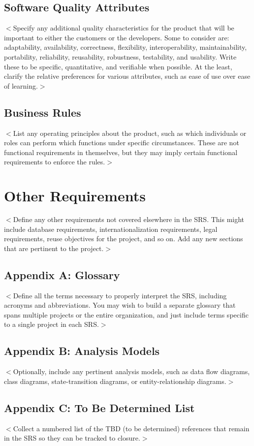 \documentclass{scrreprt}
\begin{document}
\section{Software Quality Attributes}
$<$Specify any additional quality characteristics for the product that will be 
important to either the customers or the developers. Some to consider are: 
adaptability, availability, correctness, flexibility, interoperability, 
maintainability, portability, reliability, reusability, robustness, testability, 
and usability. Write these to be specific, quantitative, and verifiable when 
possible. At the least, clarify the relative preferences for various attributes, 
such as ease of use over ease of learning.$>$

\section{Business Rules}
$<$List any operating principles about the product, such as which individuals or 
roles can perform which functions under specific circumstances. These are not 
functional requirements in themselves, but they may imply certain functional 
requirements to enforce the rules.$>$


\chapter{Other Requirements}
$<$Define any other requirements not covered elsewhere in the SRS. This might 
include database requirements, internationalization requirements, legal 
requirements, reuse objectives for the project, and so on. Add any new sections 
that are pertinent to the project.$>$

\section{Appendix A: Glossary}
$<$Define all the terms necessary to properly interpret the SRS, including 
acronyms and abbreviations. You may wish to build a separate glossary that spans 
multiple projects or the entire organization, and just include terms specific to 
a single project in each SRS.$>$

\section{Appendix B: Analysis Models}
$<$Optionally, include any pertinent analysis models, such as data flow 
diagrams, class diagrams, state-transition diagrams, or entity-relationship 
diagrams.$>$

\section{Appendix C: To Be Determined List}
$<$Collect a numbered list of the TBD (to be determined) references that remain 
in the SRS so they can be tracked to closure.$>$
\end{document}
